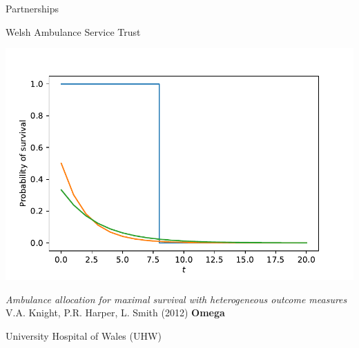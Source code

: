 \documentclass{beamer}
\begin{document}

    \begin{frame}
        \begin{center}
            \Huge
            Partnerships
        \end{center}
    \end{frame}

	\begin{frame}
		\begin{center}
			\Huge
			Welsh Ambulance Service Trust
		\end{center}
	\end{frame}

\begin{frame}
\begin{center}
	\includegraphics[width=.8\textwidth]{./img/survival_plot.pdf}
\end{center}

\textit{Ambulance allocation for maximal survival with heterogeneous outcome measures}
V.A. Knight, P.R. Harper, L. Smith (2012) \textbf{Omega}
\end{frame}


	\begin{frame}
		\begin{center}
			\Huge
			University Hospital of Wales (UHW)
		\end{center}
	\end{frame}
\end{document}
